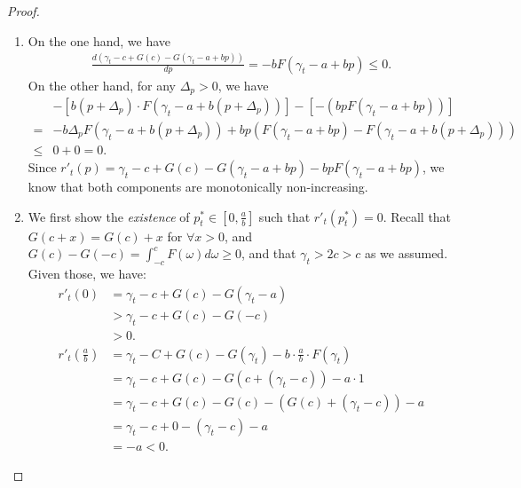 \begin{proof}
\begin{enumerate}
    \\
    \item On the one hand, we have
    \begin{equation}
        \label{eq:r'_first_part_non_increasing}
        \begin{aligned}
            \frac{d(\gamma_t - c + G(c)-G(\gamma_t-a+bp))}{d p}=-bF(\gamma_t - a + bp)\leq 0.
        \end{aligned}
    \end{equation}
    On the other hand, for any $\Delta_p>0$, we have
    \begin{equation}
        \label{eq:r'_second_part_non_increasing}
        \begin{aligned}
            &-[b(p+\Delta_p)\cdot F(\gamma_t-a+b(p+\Delta_p))]- [-(bpF(\gamma_t-a+bp))]\\
            =&-b\Delta_pF(\gamma_t-a+b(p+\Delta_p)) + bp(F(\gamma_t-a+bp) - F(\gamma_t-a+b(p+\Delta_p)))\\
            \leq& 0 + 0 = 0.
        \end{aligned}
    \end{equation}
    Since $r'_t(p)=\gamma_t - c + G(c)-G(\gamma_t-a+bp) - bpF(\gamma_t-a+bp)$, we know that both components are monotonically non-increasing.
    \\
    \item We first show the \emph{existence} of $p_t^*\in[0,\frac{a}{b}]$ such that $r'_t(p_t^*)=0$. Recall that $G(c + x) = G(c) + x$ for $\forall x>0$, and $G(c) - G(-c) = \int_{-c}^{c}F(\omega)d\omega\geq0$, and that $\gamma_t>2c>c$ as we assumed. Given those, we have:
    \begin{equation}
        \label{eq:r'_t_0_and_r'_t_a/b}
        \begin{aligned}
            r'_t(0)&=\gamma_t-c+G(c)-G(\gamma_t-a)\\
            &>\gamma_t-c+G(c)-G(-c)\\
            &>0.\\
            r'_t(\frac{a}{b})&=\gamma_t - C + G(c) - G(\gamma_t)-b\cdot\frac{a}{b}\cdot F(\gamma_t)\\
            &=\gamma_t - c + G(c) - G(c+(\gamma_t-c)) - a\cdot 1\\
            &=\gamma_t - c + G(c) - G(c) - (G(c) + (\gamma_t - c)) - a\\
            &=\gamma_t - c + 0 - (\gamma_t - c) - a\\
            &=-a<0.
        \end{aligned}
    \end{equation}

\end{enumerate}
\end{proof}
